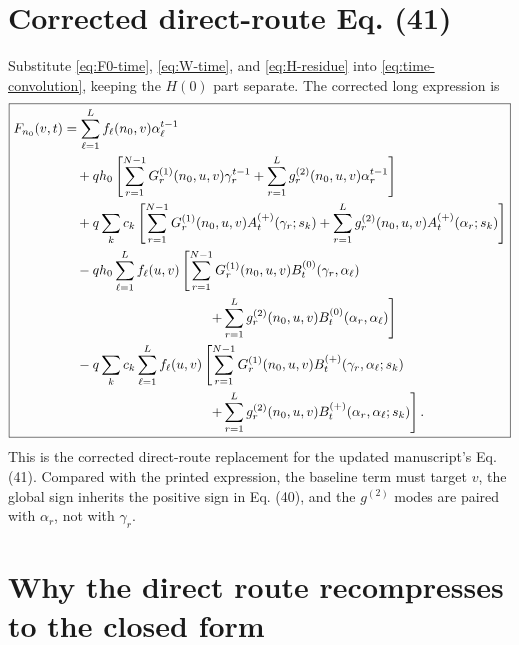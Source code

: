 \documentclass[11pt]{article}
\begin{document}
\section{Corrected direct-route Eq. (41)}

Substitute \eqref{eq:F0-time}, \eqref{eq:W-time}, and \eqref{eq:H-residue} into
\eqref{eq:time-convolution}, keeping the \(H(0)\) part separate.  The corrected
long expression is
\begin{equation}
\boxed{\begin{aligned}
F_{n_0}(v,t)
&=
\sum_{\ell=1}^{L}f_\ell(n_0,v)\alpha_\ell^{t-1}
\\
&\quad
+q h_0
\left[
\sum_{r=1}^{N-1}G^{(1)}_r(n_0,u,v)\gamma_r^{t-1}
+
\sum_{r=1}^{L}g^{(2)}_r(n_0,u,v)\alpha_r^{t-1}
\right]
\\
&\quad
+q\sum_k c_k
\left[
\sum_{r=1}^{N-1}G^{(1)}_r(n_0,u,v)A^{(+)}_t(\gamma_r;s_k)
+
\sum_{r=1}^{L}g^{(2)}_r(n_0,u,v)A^{(+)}_t(\alpha_r;s_k)
\right]
\\
&\quad
-q h_0\sum_{\ell=1}^{L}f_\ell(u,v)
\left[
\sum_{r=1}^{N-1}G^{(1)}_r(n_0,u,v)B^{(0)}_t(\gamma_r,\alpha_\ell)
\right.
\\
&\hspace{38mm}\left.
+
\sum_{r=1}^{L}g^{(2)}_r(n_0,u,v)B^{(0)}_t(\alpha_r,\alpha_\ell)
\right]
\\
&\quad
-q\sum_k c_k\sum_{\ell=1}^{L}f_\ell(u,v)
\left[
\sum_{r=1}^{N-1}G^{(1)}_r(n_0,u,v)B^{(+)}_t(\gamma_r,\alpha_\ell;s_k)
\right.
\\
&\hspace{38mm}\left.
+
\sum_{r=1}^{L}g^{(2)}_r(n_0,u,v)B^{(+)}_t(\alpha_r,\alpha_\ell;s_k)
\right].
\end{aligned}}
\label{eq:hard-route-result}
\end{equation}
This is the corrected direct-route replacement for the updated manuscript's
Eq. (41).  Compared with the printed expression, the baseline term must target
\(v\), the global sign inherits the positive sign in Eq. (40), and the
\(g^{(2)}\) modes are paired with \(\alpha_r\), not with \(\gamma_r\).

\section{Why the direct route recompresses to the closed form}
\end{document}
